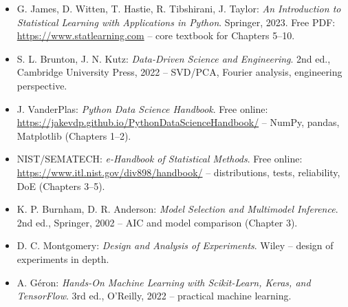 \documentclass[
  letterpaper,
  DIV=11,
  numbers=noendperiod]{scrreprt}
\providecommand{\tightlist}{%
  \setlength{\itemsep}{0pt}\setlength{\parskip}{0pt}}\usepackage{longtable,booktabs,array}
\begin{document}
\begin{itemize}
\tightlist
\item
  G. James, D. Witten, T. Hastie, R. Tibshirani, J. Taylor: \emph{An
  Introduction to Statistical Learning with Applications in Python}.
  Springer, 2023. Free PDF: \url{https://www.statlearning.com} -- core
  textbook for Chapters 5--10.
\item
  S. L. Brunton, J. N. Kutz: \emph{Data-Driven Science and Engineering}.
  2nd ed., Cambridge University Press, 2022 -- SVD/PCA, Fourier
  analysis, engineering perspective.
\item
  J. VanderPlas: \emph{Python Data Science Handbook}. Free online:
  \url{https://jakevdp.github.io/PythonDataScienceHandbook/} -- NumPy,
  pandas, Matplotlib (Chapters 1--2).
\item
  NIST/SEMATECH: \emph{e-Handbook of Statistical Methods}. Free online:
  \url{https://www.itl.nist.gov/div898/handbook/} -- distributions,
  tests, reliability, DoE (Chapters 3--5).
\item
  K. P. Burnham, D. R. Anderson: \emph{Model Selection and Multimodel
  Inference}. 2nd ed., Springer, 2002 -- AIC and model comparison
  (Chapter 3).
\item
  D. C. Montgomery: \emph{Design and Analysis of Experiments}. Wiley --
  design of experiments in depth.
\item
  A. Géron: \emph{Hands-On Machine Learning with Scikit-Learn, Keras,
  and TensorFlow}. 3rd ed., O'Reilly, 2022 -- practical machine
  learning.
\end{itemize}
\end{document}
